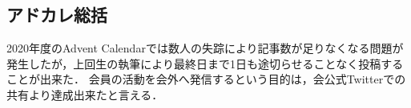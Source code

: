 \subsection*{アドカレ総括}



2020年度のAdvent Calendarでは\firstGrade{}数人の失踪により記事数が足りなくなる問題が発生したが，上回生の執筆により最終日まで1日も途切らせることなく投稿することが出来た．
会員の活動を会外へ発信するという目的は，会公式Twitterでの共有より達成出来たと言える．
